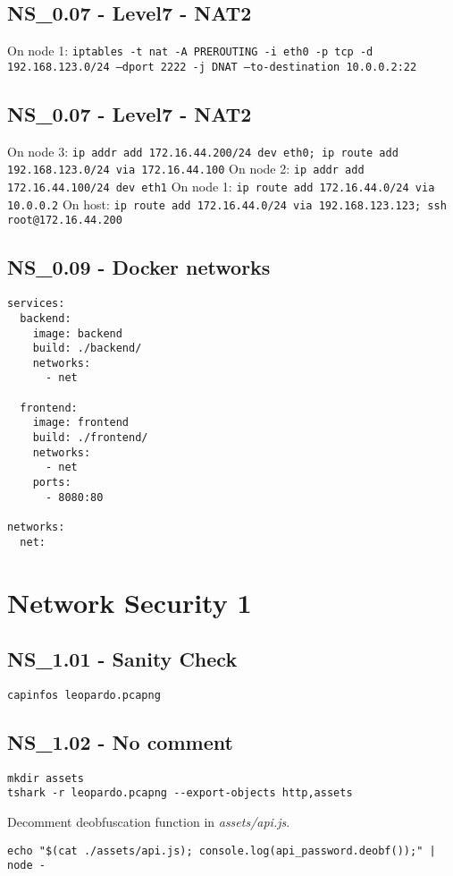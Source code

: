 \subsection{NS_0.07 - Level7 - NAT2}
On node 1: \texttt{iptables -t nat -A PREROUTING -i eth0 -p tcp -d 192.168.123.0/24 --dport 2222 -j DNAT --to-destination 10.0.0.2:22}

\subsection{NS_0.07 - Level7 - NAT2}
On node 3: \texttt{ip addr add 172.16.44.200/24 dev eth0; ip route add 192.168.123.0/24 via 172.16.44.100}
On node 2: \texttt{ip addr add 172.16.44.100/24 dev eth1}
On node 1: \texttt{ip route add 172.16.44.0/24 via 10.0.0.2}
On host: \texttt{ip route add 172.16.44.0/24 via 192.168.123.123; ssh root@172.16.44.200}

\subsection{NS_0.09 - Docker networks}
\begin{verbatim}
services:
  backend:
    image: backend
    build: ./backend/
    networks:
      - net

  frontend:
    image: frontend
    build: ./frontend/
    networks:
      - net
    ports:
      - 8080:80

networks:
  net:
\end{verbatim}

\section{Network Security 1}
\subsection{NS_1.01 - Sanity Check}
\texttt{capinfos leopardo.pcapng}

\subsection{NS_1.02 - No comment}
\begin{verbatim}
mkdir assets
tshark -r leopardo.pcapng --export-objects http,assets
\end{verbatim}

Decomment deobfuscation function in \textit{assets/api.js}. 

\texttt{echo "\$(cat ./assets/api.js); console.log(api_password.deobf());" | node -}


